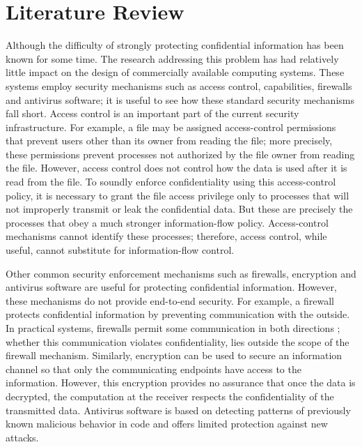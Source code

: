 \chapter{Literature Review}

Although the difficulty of strongly protecting confidential
information has been known for some time. The research
addressing this problem has had relatively little impact on the
design of commercially available computing systems. These
systems employ security mechanisms such as access control,
capabilities, firewalls and antivirus software; it is useful to see how these standard security mechanisms fall short. Access control is an important part of the current
security infrastructure. For example, a file may be assigned
access-control permissions that prevent users other than its
owner from reading the file; more precisely, these permissions
prevent processes not authorized by the file owner from
reading the file. However, access control does not control how
the data is used after it is read from the file. To soundly enforce
confidentiality using this access-control policy, it is necessary
to grant the file access privilege only to processes that will
not improperly transmit or leak the confidential data. But
these are precisely the processes that obey a much stronger
information-flow policy. Access-control mechanisms cannot
identify these processes; therefore, access control, while useful,
cannot substitute for information-flow control. 

Other common security enforcement mechanisms such as
firewalls, encryption and antivirus software are useful for protecting
confidential information. However, these mechanisms
do not provide end-to-end security. For example, a firewall
protects confidential information by preventing communication
with the outside. In practical systems, firewalls
permit some communication in both directions \cite{ref_64_box2000simple};
whether this communication violates confidentiality, lies outside
the scope of the firewall mechanism. Similarly, encryption
can be used to secure an information channel so that only
the communicating endpoints have access to the information.
However, this encryption provides no assurance that once the
data is decrypted, the computation at the receiver respects the
confidentiality of the transmitted data. Antivirus software is
based on detecting patterns of previously known malicious
behavior in code and offers limited protection against
new attacks.

